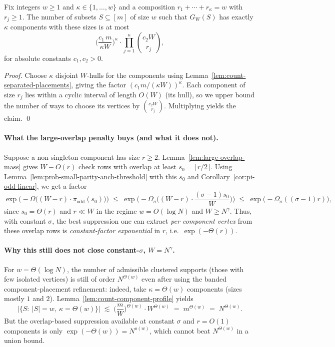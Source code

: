 \begin{lemma}
\label{lem:count-component-profile}
Fix integers $w\ge 1$ and $\kappa\in\{1,\dots,w\}$ and a composition $r_1+\cdots+r_\kappa=w$ with $r_j\ge 1$.
The number of subsets $S\subseteq [m]$ of size $w$ such that $G_W(S)$ has exactly $\kappa$ components with these sizes
is at most
\[
\Big(\frac{c_1\,m}{\kappa W}\Big)^{\kappa}\cdot \prod_{j=1}^{\kappa}\binom{c_2 W}{r_j},
\]
for absolute constants $c_1,c_2>0$.
\end{lemma}

\begin{proof}
Choose $\kappa$ disjoint $W$-hulls for the components using Lemma~\ref{lem:count-separated-placements}, giving the factor
$(c_1 m/(\kappa W))^\kappa$.
Each component of size $r_j$ lies within a cyclic interval of length $O(W)$ (its hull), so we upper bound the number of
ways to choose its vertices by $\binom{c_2 W}{r_j}$.
Multiplying yields the claim.
\qed
\end{proof}

\paragraph{What the large-overlap penalty buys (and what it does not).}
Suppose a non-singleton component has size $r\ge 2$.
Lemma~\ref{lem:large-overlap-mass} gives $W-O(r)$ check rows with overlap at least $s_0=\lceil r/2\rceil$.
Using Lemma~\ref{lem:prob-small-parity-anch-threshold} with this $s_0$ and Corollary~\ref{cor:pi-odd-linear}, we get
a factor
\[
\exp\!\big(-\Omega\big((W-r)\cdot \pi_{\mathrm{odd}}(s_0)\big)\big)
\;\le\;
\exp\!\Big(-\Omega_\sigma\Big((W-r)\cdot \frac{(\sigma-1)s_0}{W}\Big)\Big)
\;\le\;
\exp\!\big(-\Omega_\sigma((\sigma-1)r)\big),
\]
since $s_0=\Theta(r)$ and $r\ll W$ in the regime $w=O(\log N)$ and $W\ge N^\gamma$.
Thus, with constant $\sigma$, the best suppression one can extract \emph{per component vertex} from these overlap rows
is \emph{constant-factor exponential} in $r$, i.e.\ $\exp(-\Theta(r))$.

\paragraph{Why this still does not close constant-$\sigma$, $W=N^\gamma$.}
For $w=\Theta(\log N)$, the number of admissible clustered supports (those with few isolated vertices) is still
of order $N^{\Theta(w)}$ even after using the banded component-placement refinement:
indeed, take $\kappa=\Theta(w)$ components (sizes mostly $1$ and $2$). Lemma~\ref{lem:count-component-profile} yields
\[
|\{S:\ |S|=w,\ \kappa=\Theta(w)\}|
\;\lesssim\;
\Big(\frac{m}{W}\Big)^{\Theta(w)}\cdot W^{\Theta(w)}
\;=\;
m^{\Theta(w)}
\;=\;
N^{\Theta(w)}.
\]
But the overlap-based suppression available at constant $\sigma$ and $r=O(1)$ components is only
$\exp(-\Theta(w))=N^{o(w)}$, which cannot beat $N^{\Theta(w)}$ in a union bound.

